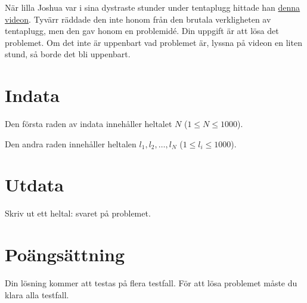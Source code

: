 \noindent
När lilla Joshua var i sina dystraste stunder under tentaplugg hittade han
\href{https://www.youtube.com/watch?v=1xtFp2Wu_To}{denna videon}. Tyvärr räddade den inte honom
från den brutala verkligheten av tentaplugg, men den gav honom en problemidé. Din uppgift
är att lösa det problemet. Om det inte är uppenbart vad problemet är, lyssna på videon en liten
stund, så borde det bli uppenbart.

\section*{Indata}
\noindent
Den första raden av indata innehåller heltalet $N$ ($1 \leq N \leq 1000$).

Den andra raden innehåller heltalen $l_1, l_2, \dots, l_N$ ($1 \leq l_i \leq 1000$).

\section*{Utdata}
\noindent
Skriv ut ett heltal: svaret på problemet.

\section*{Poängsättning}
Din lösning kommer att testas på flera testfall.
\noindent
För att lösa problemet måste du klara alla testfall.
